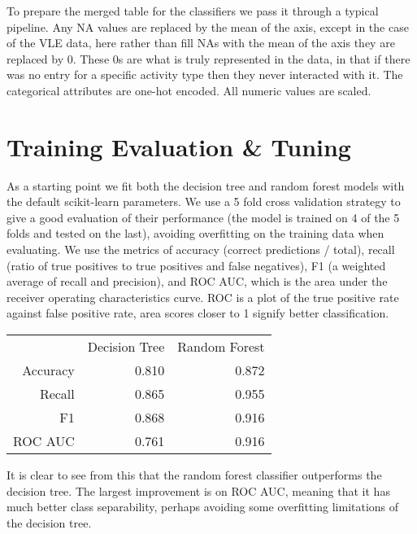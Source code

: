 \documentclass[11pt,a4paper]{article}
\begin{document}
To prepare the merged table for the classifiers we pass it through a typical pipeline. Any NA values are replaced by the mean of the axis, except in the case of the VLE data, here rather than fill NAs with the mean of the axis they are replaced by 0. These 0s are what is truly represented in the data, in that if there was no entry for a specific activity type then they never interacted with it. The categorical attributes are one-hot encoded. All numeric values are scaled.

\section{Training Evaluation \& Tuning}

As a starting point we fit both the decision tree and random forest models with the default scikit-learn parameters. We use a 5 fold cross validation strategy to give a good evaluation of their performance (the model is trained on 4 of the 5 folds and tested on the last), avoiding overfitting on the training data when evaluating. We use the metrics of accuracy (correct predictions / total),  recall (ratio of true positives to true positives and false negatives), F1 (a weighted average of recall and precision), and ROC AUC, which is the area under the receiver operating characteristics curve. ROC is a plot of the true positive rate against false positive rate, area scores closer to 1 signify better classification. 

\begin{center}
\begin{tabular}{ rrr } 
& Decision Tree & Random Forest \\ 
 Accuracy & 0.810 & 0.872 \\ 
 Recall & 0.865 & 0.955 \\
 F1 & 0.868 & 0.916 \\
 ROC AUC & 0.761 & 0.916
\end{tabular}
\end{center}

It is clear to see from this that the random forest classifier outperforms the decision tree. The largest improvement is on ROC AUC, meaning that it has much better class separability, perhaps avoiding some overfitting limitations of the decision tree.
\end{document}
